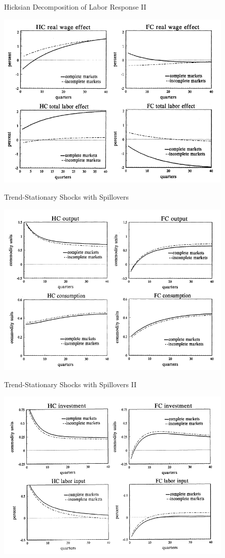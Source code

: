 \documentclass[10pt]{beamer}
\begin{document}
\begin{frame}{Hicksian Decomposition of Labor Response II}
\centerline{\includegraphics[width=0.85\textwidth]{f7.png}}
\end{frame}

\begin{frame}{Trend-Stationary Shocks with Spillovers}
\centerline{\includegraphics[width=0.85\textwidth]{u1.png}}
\end{frame}
\begin{frame}{Trend-Stationary Shocks with Spillovers II}
\centerline{\includegraphics[width=0.85\textwidth]{u2.png}}
\end{frame}
\end{document}
